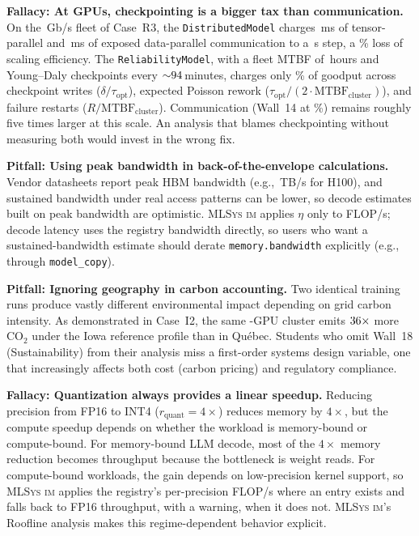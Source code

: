 \documentclass[10pt,twocolumn]{article}
\newcommand{\mlsysim}{\mbox{\textsc{MLSys}\,\textperiodcentered\,\textsc{im}}\xspace}
\newcommand{\cvalii}[1]{\pgfmathprintnumber[fixed, precision=2, 1000 sep={\,}]{#1}}
\begin{document}
\textbf{Fallacy: At \CaseRThreeGpus{} GPUs, checkpointing is a bigger tax than communication.}
On the \CaseRThreeFabricGbps\,Gb/s \CaseRThreeFabric{} fleet of Case~R3, the \texttt{DistributedModel} charges \CaseRThreeTpCommMs\,ms of tensor-parallel and \CaseRThreeDpExposedMs\,ms of exposed data-parallel communication to a \CaseRThreeStepSeconds\,s step, a \FallacyCommCommFractionPct\% loss of scaling efficiency. The \texttt{ReliabilityModel}, with a fleet MTBF of \CaseRThreeFleetMtbfHours\,hours and Young--Daly checkpoints every ${\sim}94$\,minutes, charges only \FallacyCommGoodputLossPct\% of goodput across checkpoint writes ($\delta / \tau_{\text{opt}}$), expected Poisson rework ($\tau_{\text{opt}} / (2 \cdot \text{MTBF}_{\text{cluster}})$), and failure restarts ($R / \text{MTBF}_{\text{cluster}}$). Communication (Wall~14 at \FallacyCommCommFractionPct\%) remains roughly five times larger at this scale. An analysis that blames checkpointing without measuring both would invest in the wrong fix.

\textbf{Pitfall: Using peak bandwidth in back-of-the-envelope calculations.}
Vendor datasheets report peak HBM bandwidth (e.g., \cvalii{\HhBWTBs}\,TB/s for H100), and sustained bandwidth under real access patterns can be lower, so decode estimates built on peak bandwidth are optimistic. \mlsysim applies $\eta$ only to FLOP/s; decode latency uses the registry bandwidth directly, so users who want a sustained-bandwidth estimate should derate \texttt{memory.bandwidth} explicitly (e.g., through \texttt{model\_copy}).

\textbf{Pitfall: Ignoring geography in carbon accounting.}
Two identical training runs produce vastly different environmental impact depending on grid carbon intensity. As demonstrated in Case~I2, the same \CarbonFigGpus-GPU cluster emits $36{\times}$ more CO$_2$ under the Iowa reference profile than in Qu\'ebec. Students who omit Wall~18 (Sustainability) from their analysis miss a first-order systems design variable, one that increasingly affects both cost (carbon pricing) and regulatory compliance.

\textbf{Fallacy: Quantization always provides a linear speedup.}
Reducing precision from FP16 to INT4 ($r_{\text{quant}} = 4{\times}$) reduces memory by $4{\times}$, but the compute speedup depends on whether the workload is memory-bound or compute-bound. For memory-bound LLM decode, most of the $4{\times}$ memory reduction becomes throughput because the bottleneck is weight reads. For compute-bound workloads, the gain depends on low-precision kernel support, so \mlsysim applies the registry's per-precision FLOP/s where an entry exists and falls back to FP16 throughput, with a warning, when it does not. \mlsysim's Roofline analysis makes this regime-dependent behavior explicit.
\end{document}
